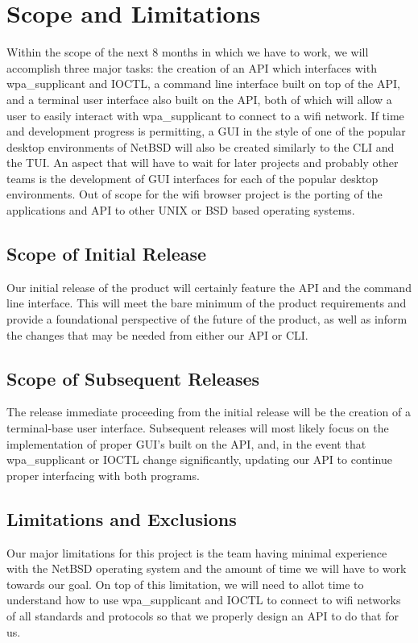 \section{Scope and Limitations}
%
Within the scope of the next 8 months in which we have to work, we will accomplish three major tasks: the creation of an API which interfaces with
wpa\_supplicant and IOCTL, a command line interface built on top of the API, and a terminal user interface also built on the API, both of which will
allow a user to easily interact with wpa\_supplicant to connect to a wifi network. If time and development progress is permitting, a GUI in the 
style of one of the popular desktop environments of NetBSD will also be created similarly to the CLI and the TUI. An aspect that will have to wait
for later projects and probably other teams is the development of GUI interfaces for each of the popular desktop environments. Out of scope for
the wifi browser project is the porting of the applications and API to other UNIX or BSD based operating systems.

\subsection{Scope of Initial Release}

Our initial release of the product will certainly feature the API and the command line interface. This will meet the bare minimum of the product
requirements and provide a foundational perspective of the future of the product, as well as inform the changes that may be needed from either our
API or CLI.

\subsection{Scope of Subsequent Releases}

The release immediate proceeding from the initial release will be the creation of a terminal-base user interface. Subsequent releases will most
likely focus on the implementation of proper GUI's built on the API, and, in the event that wpa\_supplicant or IOCTL change significantly, updating
our API to continue proper interfacing with both programs.

\subsection{Limitations and Exclusions}

Our major limitations for this project is the team having minimal experience with the NetBSD operating system and the amount of time we will
have to work towards our goal. On top of this limitation, we will need to allot time to understand how to use wpa\_supplicant and IOCTL to 
connect to wifi networks of all standards and protocols so that we properly design an API to do that for us.
